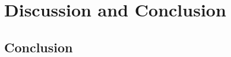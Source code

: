 
\chapter{Discussion and Conclusion}
\label{ch:Discussionandconclusion}

\section{Conclusion}
\label{sec:Conclusion}
